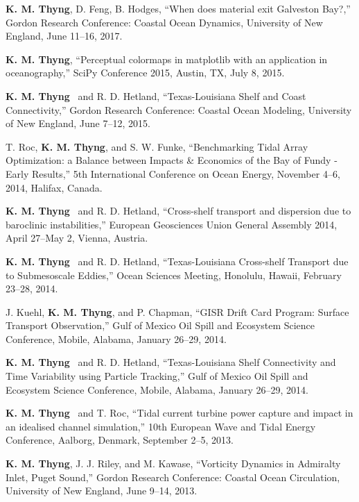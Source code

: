 \documentclass[10pt,letterpaper]{article}
\newcommand{\kmt}{\textbf{K. M. Thyng}}
\renewenvironment{itemize}{
  \begin{list}{}{
    \setlength{\leftmargin}{1.5em}
    \setlength{\itemsep}{0.25em}
    \setlength{\parskip}{0pt}
    \setlength{\parsep}{0.25em}
  }
}{
  \end{list}
}
\begin{document}
\begin{itemize}
\item \kmt, D. Feng, B. Hodges, ``When does material exit Galveston Bay?,'' Gordon Research Conference: Coastal Ocean Dynamics, University of New England, June 11--16, 2017.

\item \kmt, ``Perceptual colormaps in matplotlib with an application in oceanography,'' SciPy Conference 2015, Austin, TX, July 8, 2015.

\item \kmt~ and R. D. Hetland, ``Texas-Louisiana Shelf and Coast Connectivity,'' Gordon Research Conference: Coastal Ocean Modeling, University of New England, June 7--12, 2015.

\item T. Roc, \kmt, and S. W. Funke, ``Benchmarking Tidal Array Optimization: a Balance between Impacts \& Economics of the Bay of Fundy - Early Results,'' 5th International Conference on Ocean Energy, November 4--6, 2014, Halifax, Canada.

\item \kmt~ and R. D. Hetland, ``Cross-shelf transport and dispersion due to baroclinic instabilities,'' European Geosciences Union General Assembly 2014, April 27--May 2, Vienna, Austria.

\item \kmt~ and R. D. Hetland, ``Texas-Louisiana Cross-shelf Transport due to Submesoscale Eddies,'' Ocean Sciences Meeting, Honolulu, Hawaii, February 23--28, 2014.

\item J. Kuehl, \kmt, and P. Chapman, ``GISR Drift Card Program: Surface Transport Observation,'' Gulf of Mexico Oil Spill and Ecosystem Science Conference, Mobile, Alabama, January 26--29, 2014.

\item \kmt~ and R. D. Hetland, ``Texas-Louisiana Shelf Connectivity and Time Variability using Particle Tracking,'' Gulf of Mexico Oil Spill and Ecosystem Science Conference, Mobile, Alabama, January 26--29, 2014.

\item \kmt~ and T. Roc, ``Tidal current turbine power capture and impact in an idealised channel simulation,'' 10th European Wave and Tidal Energy Conference, Aalborg, Denmark, September 2--5, 2013.

\item \kmt, J. J. Riley, and M. Kawase, ``Vorticity Dynamics in Admiralty Inlet, Puget Sound,'' Gordon Research Conference: Coastal Ocean Circulation, University of New England, June 9--14, 2013.


\end{itemize}
\end{document}
